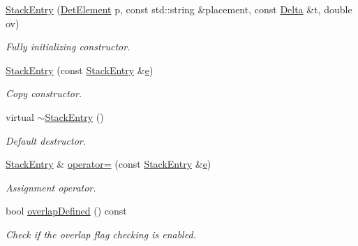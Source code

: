 \begin{DoxyCompactItemize}
\item 
\hyperlink{struct_d_d4hep_1_1_alignments_1_1_alignment_stack_1_1_stack_entry_ab70af826b6e4ccdfccf5b0ba45914fae}{Stack\+Entry} (\hyperlink{class_d_d4hep_1_1_geometry_1_1_det_element}{Det\+Element} p, const std\+::string \&placement, const \hyperlink{class_d_d4hep_1_1_alignments_1_1_delta}{Delta} \&t, double ov)
\begin{DoxyCompactList}\small\item\em Fully initializing constructor. \end{DoxyCompactList}\item 
\hyperlink{struct_d_d4hep_1_1_alignments_1_1_alignment_stack_1_1_stack_entry_a9c332ece4923052e68db8d9ff9b2e72a}{Stack\+Entry} (const \hyperlink{struct_d_d4hep_1_1_alignments_1_1_alignment_stack_1_1_stack_entry}{Stack\+Entry} \&\hyperlink{_volumes_8cpp_a8a9a1f93e9b09afccaec215310e64142}{e})
\begin{DoxyCompactList}\small\item\em Copy constructor. \end{DoxyCompactList}\item 
virtual \hyperlink{struct_d_d4hep_1_1_alignments_1_1_alignment_stack_1_1_stack_entry_ae652df4f6d2a322e1e3ec6b023782b0f}{$\sim$\+Stack\+Entry} ()
\begin{DoxyCompactList}\small\item\em Default destructor. \end{DoxyCompactList}\item 
\hyperlink{struct_d_d4hep_1_1_alignments_1_1_alignment_stack_1_1_stack_entry}{Stack\+Entry} \& \hyperlink{struct_d_d4hep_1_1_alignments_1_1_alignment_stack_1_1_stack_entry_ac970428872fc608121623bdb91ebc8ec}{operator=} (const \hyperlink{struct_d_d4hep_1_1_alignments_1_1_alignment_stack_1_1_stack_entry}{Stack\+Entry} \&\hyperlink{_volumes_8cpp_a8a9a1f93e9b09afccaec215310e64142}{e})
\begin{DoxyCompactList}\small\item\em Assignment operator. \end{DoxyCompactList}\item 
bool \hyperlink{struct_d_d4hep_1_1_alignments_1_1_alignment_stack_1_1_stack_entry_a1ae11c0171455ad158230c842dd04466}{overlap\+Defined} () const
\begin{DoxyCompactList}\small\item\em Check if the overlap flag checking is enabled. \end{DoxyCompactList}\item 

\end{DoxyCompactItemize}
